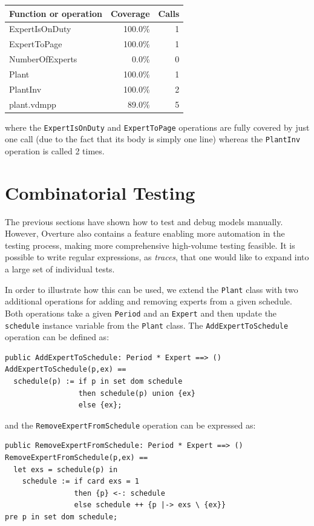\begin{longtable}{|l|r|r|}
\hline
Function or operation & Coverage & Calls \\
\hline
\hline
ExpertIsOnDuty & 100.0\% & 1 \\
\hline
ExpertToPage & 100.0\% & 1 \\
\hline
NumberOfExperts & 0.0\% & 0 \\
\hline
Plant & 100.0\% & 1 \\
\hline
PlantInv & 100.0\% & 2 \\
\hline
\hline
plant.vdmpp & 89.0\% & 5 \\
\hline
\end{longtable}

\noindent where the \texttt{ExpertIsOnDuty} and \texttt{ExpertToPage} 
operations are fully covered
by just one call (due to the fact that its body is simply one line)
whereas the \texttt{PlantInv} operation is called 2 times.

\newpage

\section{Combinatorial Testing}\label{sec:CT}

The previous sections have shown how to test and debug models
manually. However, Overture also contains a feature enabling more
automation in the testing process, making more comprehensive
high-volume testing feasible. It is possible to write regular
expressions, as \emph{traces}, that one would like to expand into a
large set of individual tests.

In order to illustrate how this can be used, we extend the
\texttt{Plant} class with two additional operations for adding and
removing experts from a given schedule. Both operations take a given
\texttt{Period} and an \texttt{Expert} and then update the
\texttt{schedule} instance variable from the \texttt{Plant} class. The
\texttt{AddExpertToSchedule} operation can be defined as:


\begin{lstlisting}
public AddExpertToSchedule: Period * Expert ==> ()
AddExpertToSchedule(p,ex) ==
  schedule(p) := if p in set dom schedule
                 then schedule(p) union {ex}
                 else {ex};
\end{lstlisting}

\noindent and the \texttt{RemoveExpertFromSchedule} operation can
be expressed as:

\begin{lstlisting}
public RemoveExpertFromSchedule: Period * Expert ==> ()
RemoveExpertFromSchedule(p,ex) == 
  let exs = schedule(p) in
    schedule := if card exs = 1
                then {p} <-: schedule
                else schedule ++ {p |-> exs \ {ex}}
pre p in set dom schedule;
\end{lstlisting}

